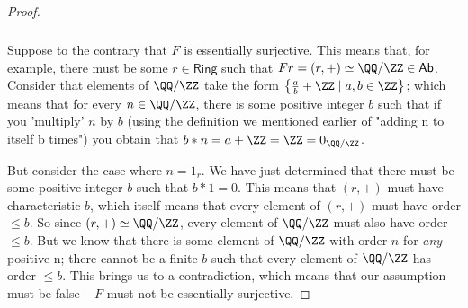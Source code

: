 \documentclass[../../main]{subfiles}
\begin{document}
\begin{proof}

	\subparagraph{}
	Suppose to the contrary that \(F\) is essentially surjective. This means
	that, for example, there must be some \(r \in \textsf{Ring}\) such that \(Fr
	= (r, +) \simeq \QQ/\ZZ \in \textsf{Ab}\). Consider that elements of
	\(\QQ/\ZZ\) take the form \(\left\{\frac{a}{b} + \ZZ \mid a, b \in
	\ZZ\right\}\); which means that for every \(n \in \QQ/\ZZ\), there is some
	positive integer \(b\) such that if you 'multiply' \(n\) by \(b\) (using the
	definition we mentioned earlier of "adding n to itself b times") you obtain
	that \(b*n = a + \ZZ = \ZZ = 0_{\QQ/\ZZ}\).

	But consider the case where \(n = 1_r\). We have just determined that there
	must be some positive integer \(b\) such that \(b*1 = 0\). This means that
	\((r, +)\) must have characteristic \(b\), which itself means that every
	element of \((r, +)\) must have order \(\leq b\). So since \((r, +) \simeq
	\QQ/\ZZ\), every element of \(\QQ/\ZZ\) must also have order \(\leq b\). But
	we know that there is some element of \(\QQ/\ZZ\) with order \(n\) for
	\textit{any} positive n; there cannot be a finite \(b\) such that every
	element of \(\QQ/\ZZ\) has order \(\leq b\). This brings us to a
	contradiction, which means that our assumption must be false -- \(F\) must
	not be essentially surjective.
\end{proof}
\end{document}
